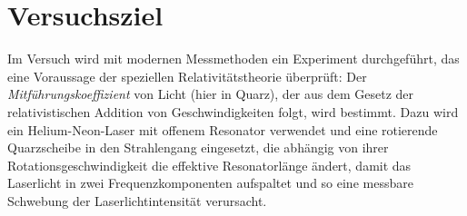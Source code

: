 \section{Versuchsziel}
Im Versuch wird mit modernen Messmethoden ein Experiment durchgeführt,
das eine Voraussage der speziellen Relativitätstheorie überprüft:
Der \emph{Mitführungskoeffizient} von Licht (hier in Quarz),
der aus dem Gesetz der relativistischen Addition von Geschwindigkeiten folgt, wird bestimmt.
Dazu wird ein Helium-Neon-Laser mit offenem Resonator verwendet und
eine rotierende Quarzscheibe in den Strahlengang eingesetzt,
die abhängig von ihrer Rotationsgeschwindigkeit die effektive Resonatorlänge ändert,
damit das Laserlicht in zwei Frequenzkomponenten aufspaltet und
so eine messbare Schwebung der Laserlichtintensität verursacht.
